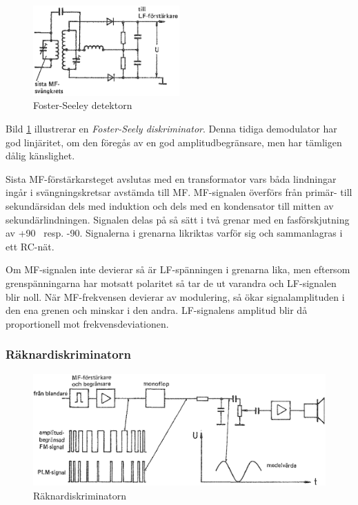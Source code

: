 \begin{figure}
\includegraphics[width=0.5\textwidth]{images/cropped_pdfs/bild_2_3-60.pdf}
\caption{Foster-Seeley detektorn}
\label{fig:BildII3-60}
\end{figure}

Bild \ref{fig:BildII3-60} illustrerar en \emph{Foster-Seely diskriminator}.
Denna tidiga demodulator har god linjäritet, om den föregås av en god
amplitudbegränsare, men har tämligen dålig känslighet.

Sista MF-förstärkarsteget avslutas med en transformator vars båda
lindningar ingår i svängningskretsar avstämda till MF.
MF-signalen överförs från primär- till sekundärsidan dels med induktion och dels
med en kondensator till mitten av sekundärlindningen.
Signalen delas på så sätt i två grenar med en fasförskjutning av +90\degree~
resp. -90\degree.
Signalerna i grenarna likriktas varför sig och sammanlagras i ett RC-nät.

Om MF-signalen inte devierar så är LF-spänningen i grenarna lika, men
eftersom grenspänningarna har motsatt polaritet så tar de ut varandra
och LF-signalen blir noll.
När MF-frekvensen devierar av modulering, så ökar signalamplituden i den ena
grenen och minskar i den andra.
LF-signalens amplitud blir då proportionell mot frekvensdeviationen.

\subsubsection{Räknardiskriminatorn}

\begin{figure}
\includegraphics[width=\textwidth]{images/cropped_pdfs/bild_2_3-61.pdf}
\caption{Räknardiskriminatorn}
\label{fig:BildII3-61}
\end{figure}

